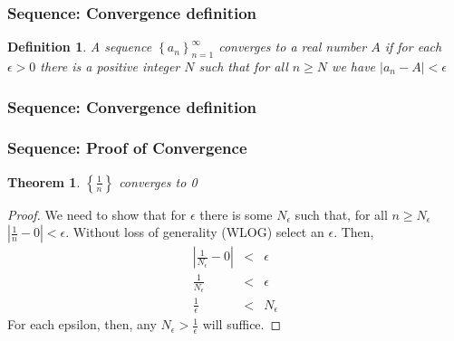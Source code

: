 \documentclass{beamer}
\newtheorem{thm}{Theorem}
\newtheorem{defn}{Definition}
\numberwithin{equation}{section}
\begin{document}
\begin{frame}
\frametitle{Sequence: Convergence definition} 

\begin{defn} A sequence $\left\{a_{n} \right\}_{n=1}^{\infty}$ converges to a real number $A$ if for each $\epsilon >0$ there is a positive integer $N$ such that for all $n \geq N$ we have $|a_{n} - A| < \epsilon$ 
\end{defn}

\pause 

\begin{itemize}
 \pause 
{} \pause {} \pause 
{} \pause 
{} 
\end{itemize}


\end{frame}


\begin{frame}
\frametitle{Sequence: Convergence definition}


\begin{center}
\end{center}

\end{frame}


\begin{frame}
\frametitle{Sequence: Proof of Convergence} 

\begin{thm} $\left\{ \frac{1}{n} \right\}$ converges to 0 
\end{thm} 

\begin{proof}  We need to show that for $\epsilon$ there is some $N_{\epsilon}$ such that, for all $n\geq N_{\epsilon}$  $|\frac{1 } {n} - 0|  < \epsilon $.  \alert{Without loss of generality} (WLOG) select an $\epsilon$.  Then,
\begin{eqnarray}
|\frac{ 1} {N_{\epsilon}} - 0 | & < &  \epsilon  \nonumber \\
\frac{1}{N_{\epsilon}} & < & \epsilon \nonumber \\
\frac{1}{\epsilon} & < &  N_{\epsilon} \nonumber 
\end{eqnarray}
For each epsilon, then, any $N_{\epsilon} > \frac{1}{\epsilon}$ will suffice.
\end{proof}

\end{frame}
\end{document}
